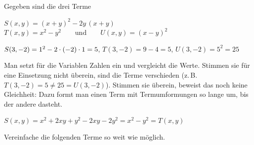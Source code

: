 \documentclass[11pt]{exam}
\begin{document}
\begin{questions}
\newpage
\noaddpoints
\question[\totalpoints]
\addpoints
Gegeben sind die drei Terme
\begin{center}
	$S(x,y)=(x+y)^2-2y\,(x+y)$\\[4pt]
	$T(x,y)=x^2-y^2\qquad\text{und}\qquad U(x,y)=(x-y)^2$
\end{center}
{\begin{solution}
	$S(3,-2)=1^2-2\cdot(-2)\cdot1=5$, \quad $T(3,-2)=9-4=5$, \quad $U(3,-2)=5^2=25$
\end{solution}}
{}
{\begin{solution}
	Man setzt für die Variablen Zahlen ein und vergleicht die Werte. Stimmen sie für eine Einsetzung nicht überein, sind die Terme verschieden (z.\,B. $T(3,-2)=5\neq 25=U(3,-2)$). Stimmen sie überein, beweist das noch keine Gleichheit: Dazu formt man einen Term mit Termumformungen so lange um, bis der andere dasteht.
\end{solution}}
{}
{\begin{solution}
	$S(x,y)=x^2+2xy+y^2-2xy-2y^2=x^2-y^2=T(x,y)$
\end{solution}}
{}


\newpage %
\noaddpoints
\question[\totalpoints]
\addpoints
Vereinfache die folgenden Terme so weit wie möglich.
\begin{parts}

\end{parts}
\end{questions}
\end{document}
